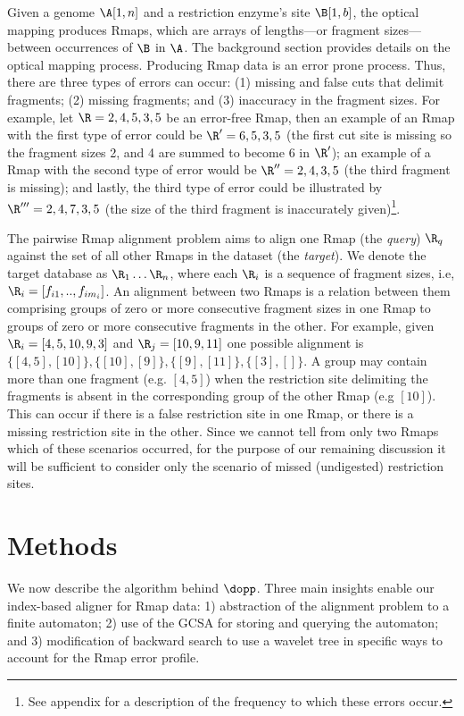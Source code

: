 \documentclass[doctor]{thesis}
\begin{document}
Given a genome $\A[1,n]$ and a restriction enzyme's site $\B[1,b]$, the optical mapping produces Rmaps, which are arrays of lengths---or fragment sizes---between occurrences of $\B$ in $\A$. The background section provides details on the optical mapping process.  Producing Rmap data is an error prone process. Thus, there are three types of errors can occur: (1) missing and false cuts that delimit fragments; (2) missing fragments; and (3) inaccuracy in the fragment sizes.  For example, let $\R = 2,4,5,3,5$ be an error-free Rmap, then an example of an Rmap with the first type of error could be $\R' = 6,5,3,5$ (the first cut site is missing so the fragment sizes 2, and 4 are summed to become 6 in $\R'$); an example of a Rmap with the second type of error would be $\R'' = 2,4,3,5$ (the third fragment is missing); and lastly, the third type of error could be illustrated by $\R''' = 2,4,7,3,5$ (the size of the third fragment is inaccurately given)\footnote{See appendix for a description of the frequency to which these errors occur.}.


The pairwise Rmap alignment problem aims to align one Rmap (the \emph{query}) $\R_q$ against the set of all other Rmaps in the dataset (the \emph{target}). We denote the target database as $\R_1 \ldots \R_n$, where each $\R_i$  is a sequence of fragment sizes, i.e, $\R_i = [f_{i1}, .., f_{im_i}]$.  An alignment between two Rmaps is a relation between them comprising groups of zero or more consecutive fragment sizes in one Rmap to groups of zero or more consecutive fragments in the other.  For example, given $\R_i =  [4, 5, 10, 9, 3]$ and $\R_j = [10, 9, 11]$ one possible alignment is $\{[4,5], [10]\}, \{ [10], [9]\}, \{[9], [11]\}, \{[3], []\}$.  A group may contain more than one fragment (e.g. $[4,5]$) when the restriction site delimiting the fragments is absent in the corresponding group of the other Rmap (e.g $[10]$). This can occur if there is a false restriction site in one Rmap, or there is a missing restriction site in the other.  Since we cannot tell from only two Rmaps which of these scenarios occurred, for the purpose of our remaining discussion it will be sufficient to consider only the scenario of missed (undigested) restriction sites. 

 
\makeatletter{}
\section{Methods}\label{sec-meods}

We now describe the algorithm behind $\dopp$.
Three main insights enable our index-based aligner for Rmap data: 1) abstraction of the alignment problem to a finite automaton; 2) use of the GCSA for storing and querying the automaton; and 3) modification of backward search to use a wavelet tree in specific ways to account for the Rmap error profile.  
\end{document}
